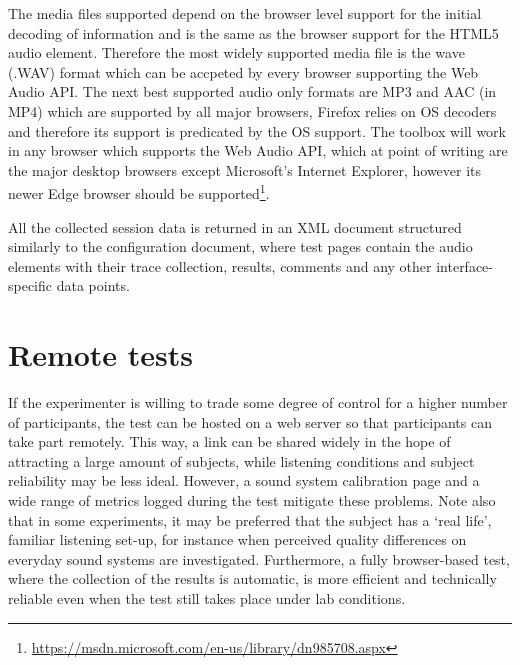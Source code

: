 \documentclass{sig-alternate}
\begin{document}
    The media files supported depend on the browser level support for the initial decoding of information and is the same as the browser support for the HTML5 audio element. Therefore the most widely supported media file is the wave (.WAV) format which can be accpeted by every browser supporting the Web Audio API. The next best supported audio only formats are MP3 and AAC (in MP4) which are supported by all major browsers, Firefox relies on OS decoders and therefore its support is predicated by the OS support. The toolbox will work in any browser which supports the Web Audio API, which at point of writing are the major desktop browsers except Microsoft's Internet Explorer, however its newer Edge browser should be supported\footnote{\url{https://msdn.microsoft.com/en-us/library/dn985708.aspx}}.
    
    All the collected session data is returned in an XML document structured similarly to the configuration document, where test pages contain the audio elements with their trace collection, results, comments and any other interface-specific data points.
    
\section{Remote tests} %
	\label{sec:remote}

	If the experimenter is willing to trade some degree of control for a higher number of participants, the test can be hosted on a web server so that participants can take part remotely. This way, a link can be shared widely in the hope of attracting a large amount of subjects, while listening conditions and subject reliability may be less ideal. However, a sound system calibration page and a wide range of metrics logged during the test mitigate these problems. Note also that in some experiments, it may be preferred that the subject has a `real life', familiar listening set-up, for instance when perceived quality differences on everyday sound systems are investigated. 
	Furthermore, a fully browser-based test, where the collection of the results is automatic, is more efficient and technically reliable even when the test still takes place under lab conditions.
\end{document}
